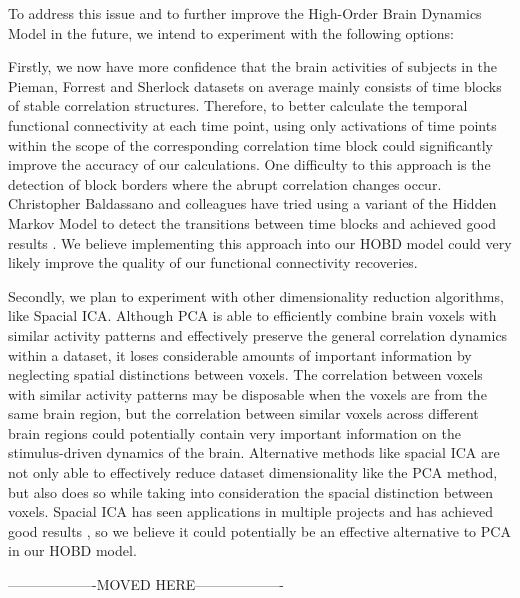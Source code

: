 \documentclass[11pt]{article}
\begin{document}
\begin{enumerate}
To address this issue and to further improve the High-Order Brain Dynamics Model in the future, we intend to experiment with the following options:

Firstly, we now have more confidence that the brain activities of subjects in the Pieman, Forrest and Sherlock datasets on average mainly consists of time blocks of stable correlation structures. Therefore, to better calculate the temporal functional connectivity at each time point, using only activations of time points within the scope of the corresponding correlation time block could significantly improve the accuracy of our calculations. One difficulty to this approach is the detection of block borders where the abrupt correlation changes occur. Christopher Baldassano and colleagues have tried using a variant of the Hidden Markov Model to detect the transitions between time blocks and achieved good results \citep{Baldassano2016}. We believe implementing this approach into our HOBD model could very likely improve the quality of our functional connectivity recoveries.

Secondly, we plan to experiment with other dimensionality reduction algorithms, like Spacial ICA. Although PCA is able to efficiently combine brain voxels with similar activity patterns and effectively preserve the general correlation dynamics within a dataset, it loses considerable amounts of important information by neglecting spatial distinctions between voxels. The correlation between voxels with similar activity patterns may be disposable when the voxels are from the same brain region, but the correlation between similar voxels across different brain regions could potentially contain very important information on the stimulus-driven dynamics of the brain. Alternative methods like spacial ICA are not only able to effectively reduce dataset dimensionality like the PCA method, but also does so while taking into consideration the spacial distinction between voxels. Spacial ICA has seen applications in multiple projects and has achieved good results \citep{Dipasquale2015,Iraji2016,Xu2013}, so we believe it could potentially be an effective alternative to PCA in our HOBD model.

-------------------MOVED HERE-------------------


\end{enumerate}
\end{document}
